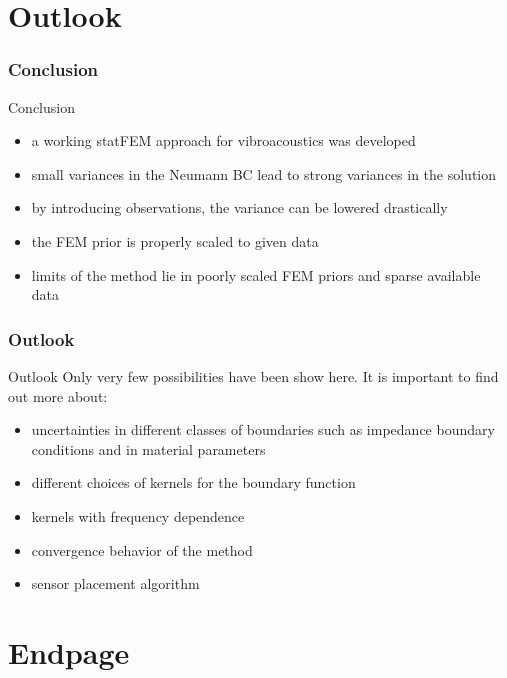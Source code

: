 \documentclass[fleqn,11pt,aspectratio=43]{beamer}
\begin{document}
\part{Outlook}

\begin{frame}[plain]
  \partpage
\end{frame}

\section{Conclusion}
\begin{frame}{Conclusion}
\begin{itemize}
\item a working statFEM approach for vibroacoustics was developed
\item small variances in the Neumann BC lead to strong variances in the solution
\item by introducing observations, the variance can be lowered drastically
\item the FEM prior is properly scaled to given data\\

\item limits of the method lie in poorly scaled FEM priors and sparse available data
\end{itemize}
\end{frame}

\section{Outlook}
\begin{frame}{Outlook}
Only very few possibilities have been show here. It is important to find out more about:
\begin{itemize}
\item uncertainties in different classes of boundaries such as impedance boundary conditions and in material parameters
\item different choices of kernels for the boundary function
\item kernels with frequency dependence
\item convergence behavior of the method
\item sensor placement algorithm
\end{itemize}
\end{frame}


\part{Endpage}
\end{document}
